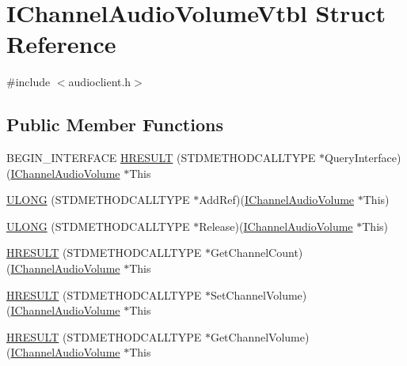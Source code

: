 \hypertarget{struct_i_channel_audio_volume_vtbl}{}\section{I\+Channel\+Audio\+Volume\+Vtbl Struct Reference}
\label{struct_i_channel_audio_volume_vtbl}


{\ttfamily \#include $<$audioclient.\+h$>$}

\subsection*{Public Member Functions}
\begin{DoxyCompactItemize}
\item 
B\+E\+G\+I\+N\+\_\+\+I\+N\+T\+E\+R\+F\+A\+CE \hyperlink{struct_i_channel_audio_volume_vtbl_a6c6be2d3a89427b6ccb0776175227fe3}{H\+R\+E\+S\+U\+LT} (S\+T\+D\+M\+E\+T\+H\+O\+D\+C\+A\+L\+L\+T\+Y\+PE $\ast$Query\+Interface)(\hyperlink{audioclient_8h_a46abbe93dca3b592534afab4d91d75f9}{I\+Channel\+Audio\+Volume} $\ast$This
\item 
\hyperlink{struct_i_channel_audio_volume_vtbl_adf76d4b5f52aabfa3dae39a45802ddf9}{U\+L\+O\+NG} (S\+T\+D\+M\+E\+T\+H\+O\+D\+C\+A\+L\+L\+T\+Y\+PE $\ast$Add\+Ref)(\hyperlink{audioclient_8h_a46abbe93dca3b592534afab4d91d75f9}{I\+Channel\+Audio\+Volume} $\ast$This)
\item 
\hyperlink{struct_i_channel_audio_volume_vtbl_a0a728d25cb92c64bc999c70e5fe88ede}{U\+L\+O\+NG} (S\+T\+D\+M\+E\+T\+H\+O\+D\+C\+A\+L\+L\+T\+Y\+PE $\ast$Release)(\hyperlink{audioclient_8h_a46abbe93dca3b592534afab4d91d75f9}{I\+Channel\+Audio\+Volume} $\ast$This)
\item 
\hyperlink{struct_i_channel_audio_volume_vtbl_a55c3df5afc2d5f89ea118497887897d2}{H\+R\+E\+S\+U\+LT} (S\+T\+D\+M\+E\+T\+H\+O\+D\+C\+A\+L\+L\+T\+Y\+PE $\ast$Get\+Channel\+Count)(\hyperlink{audioclient_8h_a46abbe93dca3b592534afab4d91d75f9}{I\+Channel\+Audio\+Volume} $\ast$This
\item 
\hyperlink{struct_i_channel_audio_volume_vtbl_a1c7e551b5bc9866b00f7870de1681f49}{H\+R\+E\+S\+U\+LT} (S\+T\+D\+M\+E\+T\+H\+O\+D\+C\+A\+L\+L\+T\+Y\+PE $\ast$Set\+Channel\+Volume)(\hyperlink{audioclient_8h_a46abbe93dca3b592534afab4d91d75f9}{I\+Channel\+Audio\+Volume} $\ast$This
\item 
\hyperlink{struct_i_channel_audio_volume_vtbl_a7c3db72d0cc492692bb52f4c2e24d650}{H\+R\+E\+S\+U\+LT} (S\+T\+D\+M\+E\+T\+H\+O\+D\+C\+A\+L\+L\+T\+Y\+PE $\ast$Get\+Channel\+Volume)(\hyperlink{audioclient_8h_a46abbe93dca3b592534afab4d91d75f9}{I\+Channel\+Audio\+Volume} $\ast$This

\end{DoxyCompactItemize}
